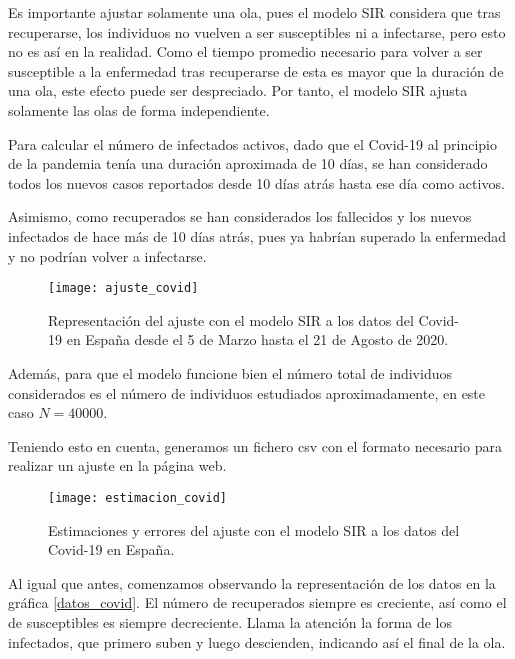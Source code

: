 Es importante ajustar solamente una ola, pues el modelo SIR considera que tras recuperarse, los individuos no vuelven a ser susceptibles ni a infectarse, pero esto no es así en la realidad. Como el tiempo promedio necesario para volver a ser susceptible a la enfermedad tras recuperarse de esta es mayor que la duración de una ola, este efecto puede ser despreciado. Por tanto, el modelo SIR ajusta solamente las olas de forma independiente. 

Para calcular el número de infectados activos, dado que el Covid-19 al principio de la pandemia tenía una duración aproximada de 10 días, se han considerado todos los nuevos casos reportados desde 10 días atrás hasta ese día como activos.

Asimismo, como recuperados se han considerados los fallecidos y los nuevos infectados de hace más de 10 días atrás, pues ya habrían superado la enfermedad y no podrían volver a infectarse.

\begin{figure}
\begin{center}
\caption{Representación del ajuste con el modelo SIR a los datos del Covid-19 en España desde el 5 de Marzo hasta el 21 de Agosto de 2020.}
\label{ajuste_covid}
\texttt{[image: ajuste\_covid]}
\end{center}
\end{figure}

Además, para que el modelo funcione bien el número total de individuos considerados es el número de individuos estudiados aproximadamente, en este caso $N=40000$.

Teniendo esto en cuenta, generamos un fichero csv con el formato necesario para realizar un ajuste en la página web.

\begin{figure}
\begin{center}
\caption{Estimaciones y errores del ajuste con el modelo SIR a los datos del Covid-19 en España.}
\label{estimacion_covid}
\texttt{[image: estimacion\_covid]}
\end{center}
\end{figure}

Al igual que antes, comenzamos observando la representación de los datos en la gráfica \ref{datos_covid}. El número de recuperados siempre es creciente, así como el de susceptibles es siempre decreciente. Llama la atención la forma de los infectados, que primero suben y luego descienden, indicando así el final de la ola.

